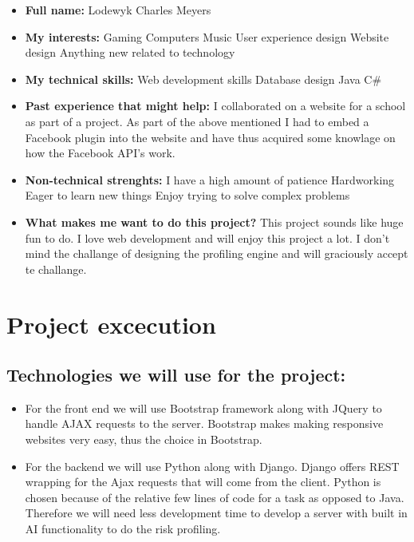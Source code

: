 \documentclass{article}
\begin{document}
	\begin{itemize}
		\item \textbf{Full name:} Lodewyk Charles Meyers
		\item \textbf{My interests:}
			\subitem Gaming
			\subitem Computers
			\subitem Music
			\subitem User experience design
			\subitem Website design
			\subitem Anything new related to technology
		\item \textbf{My technical skills:}
			\subitem Web development skills
			\subitem Database design
			\subitem Java
			\subitem C\#
		\item \textbf{Past experience that might help:}
			\subitem I collaborated on a website for a school as part of a project.
			\subitem As part of the above mentioned I had to embed a Facebook plugin into the website and have thus acquired some knowlage on how the Facebook API's work.
		\item \textbf{Non-technical strenghts:}
			\subitem I have a high amount of patience
			\subitem Hardworking
			\subitem Eager to learn new things
			\subitem Enjoy trying to solve complex problems
		\item \textbf{What makes me want to do this project?} This project sounds like huge fun to do. I love web development and will enjoy this project a lot. I don't mind the challange of designing the profiling engine and will graciously accept te challange.
	\end{itemize}
	
	\section{Project excecution}
		\subsection{Technologies we will use for the project:}
		\begin{itemize}
			\item For the front end we will use Bootstrap framework along with JQuery to handle AJAX requests to the server. Bootstrap makes making responsive websites very easy, thus the choice in Bootstrap.
			\item For the backend we will use Python along with Django. Django offers REST wrapping for the Ajax requests that will come from the client. Python is chosen because of the relative few lines of code for a task as opposed to Java. Therefore we will need less development time to develop a server with built in AI functionality to do the risk profiling.			
		\end{itemize}
\end{document}
